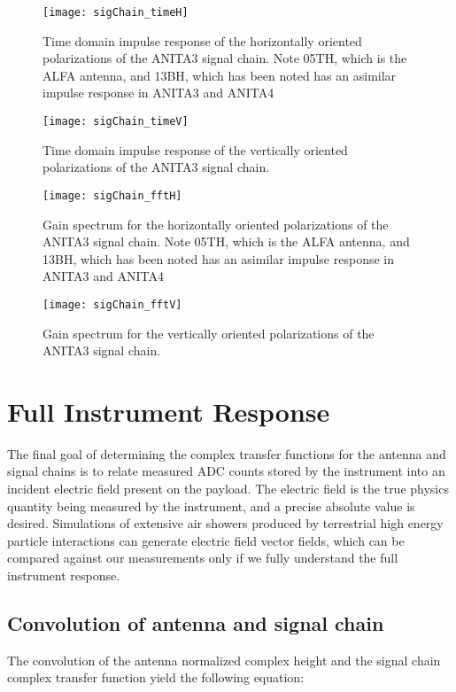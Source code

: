 		
\begin{figure}
\centering
	\texttt{[image: sigChain\_timeH]}
	\caption{Time domain impulse response of the horizontally oriented polarizations of the ANITA3 signal chain.  Note 05TH, which is the ALFA antenna, and 13BH, which has been noted has an asimilar impulse response in ANITA3 and ANITA4}
\label{fig:sigChain_timeH}
\end{figure}

\begin{figure}
\centering
	\texttt{[image: sigChain\_timeV]}
	\caption{Time domain impulse response of the vertically oriented polarizations of the ANITA3 signal chain.}
\label{fig:sigChain_timeV}
\end{figure}

\begin{figure}
\centering
	\texttt{[image: sigChain\_fftH]}
	\caption{Gain spectrum for the horizontally oriented polarizations of the ANITA3 signal chain.  Note 05TH, which is the ALFA antenna, and 13BH, which has been noted has an asimilar impulse response in ANITA3 and ANITA4}
\label{fig:sigChain_fftH}
\end{figure}

\begin{figure}
\centering
	\texttt{[image: sigChain\_fftV]}
	\caption{Gain spectrum for the vertically oriented polarizations of the ANITA3 signal chain.}
\label{fig:sigChain_fftV}
\end{figure}
	

\section{Full Instrument Response}

	The final goal of determining the complex transfer functions for the antenna and signal chains is to relate measured ADC counts stored by the instrument into an incident electric field present on the payload.  The electric field is the true physics quantity being measured by the instrument, and a precise absolute value is desired.  Simulations of extensive air showers produced by terrestrial high energy particle interactions can generate electric field vector fields, which can be compared against our measurements only if we fully understand the full instrument response.
	
	\subsection{Convolution of antenna and signal chain}
		The convolution of the antenna normalized complex height and the signal chain complex transfer function yield the following equation:
		
